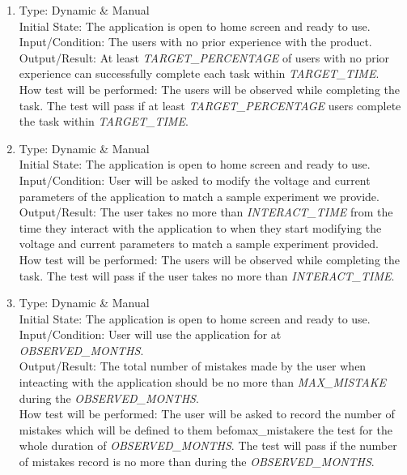 \documentclass[12pt, titlepage]{article}
\begin{document}
\begin{adjustwidth}{2.2em}{0pt}
\begin{enumerate}[{NF-UT}1.]
  \item Type: Dynamic \& Manual\\
  Initial State: The application is open to home screen  and ready to use.\\
  Input/Condition: The users with no prior experience with the product.\\
  Output/Result: At least \textsl{TARGET\_PERCENTAGE} of users with no prior experience  can successfully complete each task within \textsl{TARGET\_TIME}.\\
  How test will be performed: The users will be observed while completing the task. The test will pass if at least \textsl{TARGET\_PERCENTAGE} users complete the task within \textsl{TARGET\_TIME}.

  \item Type: Dynamic \& Manual\\
  Initial State: The application is open to home screen  and ready to use.\\
  Input/Condition: User will be asked to modify the voltage and current parameters of the application to match a sample experiment we provide.\\
  Output/Result: The user takes no more than \textsl{INTERACT\_TIME} from the time they interact with the application to when they start modifying the voltage and current parameters to match a sample experiment provided.\\
  How test will be performed: The users will be observed while completing the task. The test will pass if the user takes no more than \textsl{INTERACT\_TIME}.

  \item Type: Dynamic \& Manual \\
  Initial State: The application is open to home screen  and ready to use.\\
  Input/Condition: User will use the application for at \textsl{OBSERVED\_MONTHS}.\\
  Output/Result: The total number of mistakes made by the user when inteacting with the application should be no more than \textsl{MAX\_MISTAKE} during the  \textsl{OBSERVED\_MONTHS}.\\
  How test will be performed: The user will be asked to record the number of mistakes which will be defined to them befomax\_mistakere the test for the whole duration of \textsl{OBSERVED\_MONTHS}.  The test will pass if the number of mistakes record is no more than \textsl{} during the  \textsl{OBSERVED\_MONTHS}.


\end{enumerate}
\end{adjustwidth}
\end{document}
